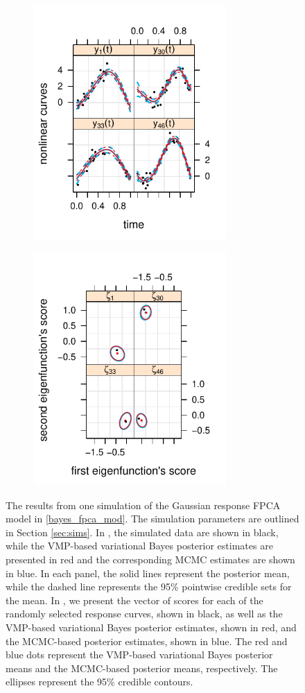 \documentclass[12pt]{article}
\theoremstyle{plain}
\theoremstyle{definition}
\theoremstyle{remark}
\begin{document}
\begin{figure}
	\centering
	\begin{subfigure}[t]{0.49\textwidth}
		\centering
		\includegraphics[width=2.9in]{images/response_curves.pdf}
	\caption{}
	\label{subfig:gauss_response_curves}
	\end{subfigure}
	\begin{subfigure}[t]{0.49\textwidth}
		\centering
		\includegraphics[width=2.9in]{images/scores.pdf}
	\caption{}
	\label{subfig:gauss_response_scores}
	\end{subfigure}
\caption{
	The results from one simulation of the Gaussian response FPCA model in \eqref{bayes_fpca_mod}. The
	simulation parameters are outlined in Section \ref{sec:sims}.
	In , the simulated data are shown in black, while the VMP-based
	variational Bayes posterior estimates are presented in red and the corresponding MCMC estimates
	are shown in blue. In each panel, the solid lines represent
	the posterior mean, while the dashed line represents the 95\% pointwise credible sets for the mean.
	In , we present the vector of scores for each of the
	randomly selected response curves,
	shown in black, as well as the VMP-based variational Bayes posterior estimates, shown in red, and the
	MCMC-based posterior estimates, shown in blue. The red and blue dots represent the VMP-based
	variational Bayes posterior means and the MCMC-based posterior means, respectively.
	The ellipses represent the 95\% credible contours.
}
\label{fig:gauss_resp_sim}
\end{figure}
\end{document}
